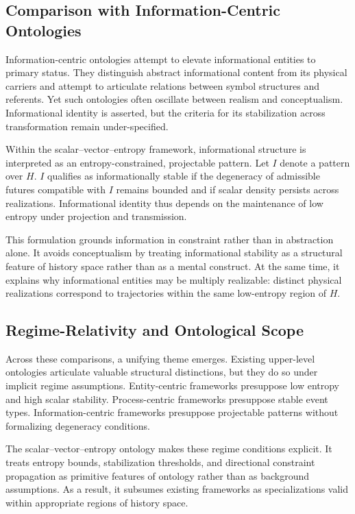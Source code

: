 \documentclass[12pt]{article}
\begin{document}
\subsection{Comparison with Information-Centric Ontologies}

Information-centric ontologies attempt to elevate informational entities to primary status. They distinguish abstract informational content from its physical carriers and attempt to articulate relations between symbol structures and referents. Yet such ontologies often oscillate between realism and conceptualism. Informational identity is asserted, but the criteria for its stabilization across transformation remain under-specified.

Within the scalar–vector–entropy framework, informational structure is interpreted as an entropy-constrained, projectable pattern. Let $I$ denote a pattern over $H$. $I$ qualifies as informationally stable if the degeneracy of admissible futures compatible with $I$ remains bounded and if scalar density persists across realizations. Informational identity thus depends on the maintenance of low entropy under projection and transmission.

This formulation grounds information in constraint rather than in abstraction alone. It avoids conceptualism by treating informational stability as a structural feature of history space rather than as a mental construct. At the same time, it explains why informational entities may be multiply realizable: distinct physical realizations correspond to trajectories within the same low-entropy region of $H$.

\subsection{Regime-Relativity and Ontological Scope}

Across these comparisons, a unifying theme emerges. Existing upper-level ontologies articulate valuable structural distinctions, but they do so under implicit regime assumptions. Entity-centric frameworks presuppose low entropy and high scalar stability. Process-centric frameworks presuppose stable event types. Information-centric frameworks presuppose projectable patterns without formalizing degeneracy conditions.

The scalar–vector–entropy ontology makes these regime conditions explicit. It treats entropy bounds, stabilization thresholds, and directional constraint propagation as primitive features of ontology rather than as background assumptions. As a result, it subsumes existing frameworks as specializations valid within appropriate regions of history space.
\end{document}
